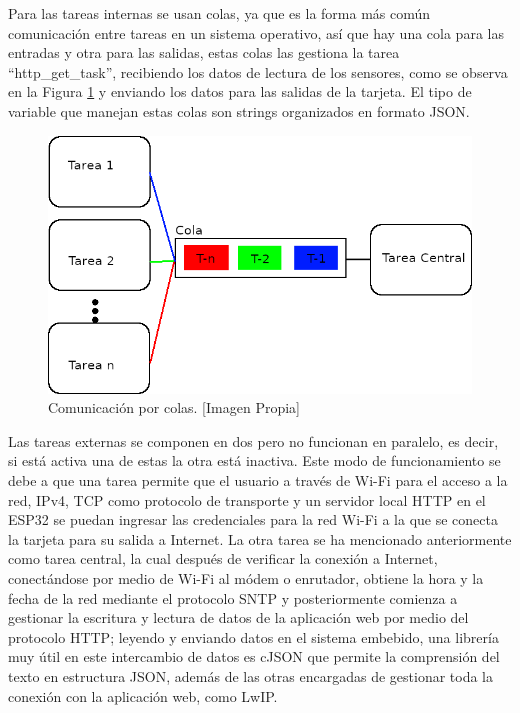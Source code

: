 Para las tareas internas se usan colas, ya que es la forma más común comunicación entre tareas en un sistema operativo, así que hay una cola para las entradas y otra para las salidas, estas colas las gestiona la tarea ``http\_get\_task'', recibiendo los datos de lectura de los sensores, como se observa en la Figura \ref{fig:colas} y enviando los datos para las salidas de la tarjeta. El tipo de variable que manejan estas colas son strings organizados en formato JSON.\\

\begin{figure}[H]
	\centering
	\caption[Comunicación por colas.]{Comunicación por colas. [Imagen Propia]}
	\label{fig:colas}
	\includegraphics[width=0.5\linewidth]{Imagenes/B_colas}
\end{figure}

Las tareas externas se componen en dos pero no funcionan en paralelo, es decir, si está activa una de estas la otra está inactiva. Este modo de funcionamiento se debe a que una tarea permite que el usuario a través de Wi-Fi para el acceso a la red, IPv4, TCP como protocolo de transporte y un servidor local HTTP en el ESP32 se puedan ingresar las credenciales para la red Wi-Fi a la que se conecta la tarjeta para su salida a Internet. La otra tarea se ha mencionado anteriormente como tarea central, la cual después de verificar la conexión a Internet, conectándose por medio de Wi-Fi al módem o enrutador, obtiene la hora y la fecha de la red mediante el protocolo SNTP y posteriormente comienza a gestionar la escritura y lectura de datos de la aplicación web por medio del protocolo HTTP; leyendo y enviando datos en el sistema embebido, una librería muy útil en este intercambio de datos es cJSON que permite la comprensión del texto en estructura JSON, además de las otras encargadas de gestionar toda la conexión con la aplicación web, como LwIP.\\


